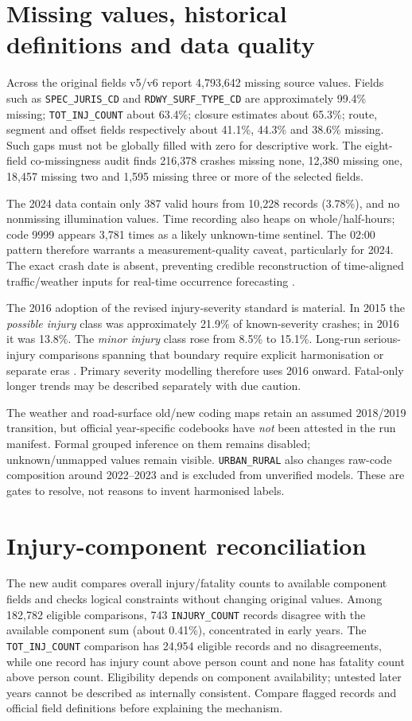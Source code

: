 \documentclass[11pt,a4paper,openany]{report}
\newcommand{\pathcode}[1]{\nolinkurl{#1}}
\begin{document}
\section{Missing values, historical definitions and data quality}
Across the original fields v5/v6 report 4,793,642 missing source values. Fields such as \pathcode{SPEC_JURIS_CD} and \pathcode{RDWY_SURF_TYPE_CD} are approximately 99.4\% missing; \pathcode{TOT_INJ_COUNT} about 63.4\%; closure estimates about 65.3\%; route, segment and offset fields respectively about 41.1\%, 44.3\% and 38.6\% missing. Such gaps must not be globally filled with zero for descriptive work. The eight-field co-missingness audit finds 216,378 crashes missing none, 12,380 missing one, 18,457 missing two and 1,595 missing three or more of the selected fields.

The 2024 data contain only 387 valid hours from 10,228 records (3.78\%), and no nonmissing illumination values. Time recording also heaps on whole/half-hours; code 9999 appears 3,781 times as a likely unknown-time sentinel. The 02:00 pattern therefore warrants a measurement-quality caveat, particularly for 2024. The exact crash date is absent, preventing credible reconstruction of time-aligned traffic/weather inputs for real-time occurrence forecasting \cite{WPRDC}.

The 2016 adoption of the revised injury-severity standard is material. In 2015 the \emph{possible injury} class was approximately 21.9\% of known-severity crashes; in 2016 it was 13.8\%. The \emph{minor injury} class rose from 8.5\% to 15.1\%. Long-run serious-injury comparisons spanning that boundary require explicit harmonisation or separate eras \cite{PennDOT2016}. Primary severity modelling therefore uses 2016 onward. Fatal-only longer trends may be described separately with due caution.

The weather and road-surface old/new coding maps retain an assumed 2018/2019 transition, but official year-specific codebooks have \emph{not} been attested in the run manifest. Formal grouped inference on them remains disabled; unknown/unmapped values remain visible. \pathcode{URBAN_RURAL} also changes raw-code composition around 2022--2023 and is excluded from unverified models. These are gates to resolve, not reasons to invent harmonised labels.

\section{Injury-component reconciliation}
The new audit compares overall injury/fatality counts to available component fields and checks logical constraints without changing original values. Among 182,782 eligible comparisons, 743 \pathcode{INJURY_COUNT} records disagree with the available component sum (about 0.41\%), concentrated in early years. The \pathcode{TOT_INJ_COUNT} comparison has 24,954 eligible records and no disagreements, while one record has injury count above person count and none has fatality count above person count. Eligibility depends on component availability; untested later years cannot be described as internally consistent. Compare flagged records and official field definitions before explaining the mechanism.
\end{document}
